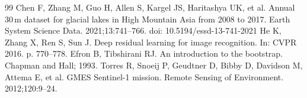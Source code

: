 \documentclass[11pt,a4paper]{article}
\begin{document}
\begin{thebibliography}{99}
 Chen F, Zhang M, Guo H, Allen S, Kargel JS, Haritashya UK, et al. Annual 30\,m dataset for glacial lakes in High Mountain Asia from 2008 to 2017. Earth System Science Data. 2021;13:741--766. doi: 10.5194/essd-13-741-2021
 He K, Zhang X, Ren S, Sun J. Deep residual learning for image recognition. In: CVPR 2016. p. 770--778.
 Efron B, Tibshirani RJ. An introduction to the bootstrap. Chapman and Hall; 1993.
 Torres R, Snoeij P, Geudtner D, Bibby D, Davidson M, Attema E, et al. GMES Sentinel-1 mission. Remote Sensing of Environment. 2012;120:9--24.
\end{thebibliography}
\end{document}
